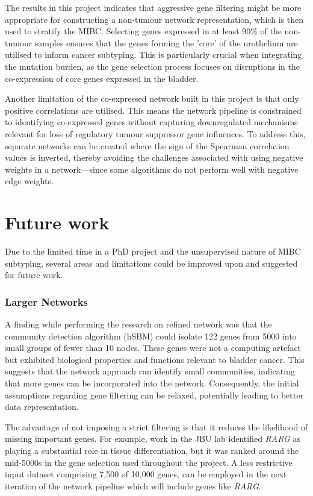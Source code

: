 The results in this project indicates that aggressive gene filtering might be more appropriate for constructing a non-tumour network representation, which is then used to stratify the MIBC. Selecting genes expressed in at least 90\% of the non-tumour samples ensures that the genes forming the 'core' of the urothelium are utilised to inform cancer subtyping. This is particularly crucial when integrating the mutation burden, as the gene selection process focuses on disruptions in the co-expression of core genes expressed in the bladder.

Another limitation of the co-expressed network built in this project is that only positive correlations are utilised. This means the network pipeline is constrained to identifying co-expressed genes without capturing downregulated mechanisms relevant for loss of regulatory tumour suppressor gene influences. To address this, separate networks can be created where the sign of the Spearman correlation values is inverted, thereby avoiding the challenges associated with using negative weights in a network—since some algorithms do not perform well with negative edge weights.


\section{Future work} \label{s:future_work}

Due to the limited time in a PhD project and the unsupervised nature of MIBC subtyping, several areas and limitations could be improved upon and suggested for future work.

\subsubsection*{Larger Networks}

A finding while performing the research on refined network was that the community detection algorithm (hSBM) could isolate 122 genes from 5000 into small groups of fewer than 10 nodes. These genes were not a computing artefact but exhibited biological properties and functions relevant to bladder cancer. This suggests that the network approach can identify small communities, indicating that more genes can be incorporated into the network. Consequently, the initial assumptions regarding gene filtering can be relaxed, potentially leading to better data representation.

The advantage of not imposing a strict filtering is that it reduces the likelihood of missing important genes. For example, work in the JBU lab identified \textit{RARG} as playing a substantial role in tissue differentiation, but it was ranked around the mid-5000s in the gene selection used throughout the project. A less restrictive input dataset comprising 7,500 of 10,000 genes, can be employed in the next iteration of the network pipeline which will include genes like \textit{RARG}.

